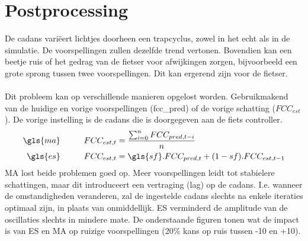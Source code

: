\section{Postprocessing}
De cadans variëert lichtjes doorheen een trapcyclus, zowel in het echt als in de simulatie. De voorspellingen zullen dezelfde trend vertonen. Bovendien kan een beetje ruis of het gedrag van de fietser voor afwijkingen zorgen, bijvoorbeeld een grote sprong tussen twee voorspellingen. Dit kan ergerend zijn voor de fietser.
\\\\
Dit probleem kan op verschillende manieren opgelost worden. Gebruikmakend van de huidige en vorige voorspellingen (\gls{fcc_pred}) of de vorige schatting ($FCC_{est}$). De vorige instelling is de cadans die is doorgegeven aan de fiets controller.
\begin{align*}
\gls{ma} \tab  FCC_{est,t} &= \frac{\sum_{i=0}^{n} FCC_{pred,t-i} }{n}\\
\gls{es} \tab FCC_{est,t} &= \gls{sf} . FCC_{pred,t} + (1-sf) . FCC_{est,t-1}
\end{align*}
MA lost beide problemen goed op. Meer voorspellingen leidt tot stabielere schattingen, maar dit introduceert een vertraging (lag) op de cadans. I.e. wanneer de omstandigheden veranderen, zal de ingestelde cadans slechts na enkele iteraties optimaal zijn, in plaats van onmiddellijk. ES verminderd de amplitude van de oscillaties slechts in mindere mate. De onderstaande figuren tonen wat de impact is van ES en MA op ruizige voorspellingen (20\% kans op ruis tussen -10 en +10).
